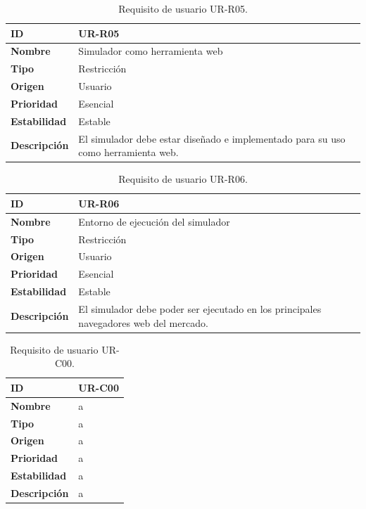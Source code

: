 \begin{center}
\begin{table}[htbp]
\centering
\begin{tabular}{@{}p{2.5cm} p{9cm}@{}} 
\toprule
\textbf{ID} 				& UR-R05 \\
\midrule
\textbf{Nombre} 			& Simulador como herramienta web \\
\midrule
\textbf{Tipo} 			& Restricción \\
\midrule
\textbf{Origen} 			& Usuario \\
\midrule
\textbf{Prioridad}		& Esencial \\
\midrule
\textbf{Estabilidad} 		& Estable \\
\midrule
\textbf{Descripción} 	& El simulador debe estar diseñado e implementado para su uso como herramienta web. \\
\bottomrule
\end{tabular}
\caption{Requisito de usuario UR-R05.}
\label{tab:urr05}
\end{table}
\end{center}

\begin{center}
\begin{table}[htbp]
\centering
\begin{tabular}{@{}p{2.5cm} p{9cm}@{}} 
\toprule
\textbf{ID} 				& UR-R06 \\
\midrule
\textbf{Nombre} 			& Entorno de ejecución del simulador \\
\midrule
\textbf{Tipo} 			& Restricción \\
\midrule
\textbf{Origen} 			& Usuario \\
\midrule
\textbf{Prioridad}		& Esencial \\
\midrule
\textbf{Estabilidad} 		& Estable \\
\midrule
\textbf{Descripción} 	& El simulador debe poder ser ejecutado en los principales navegadores web del mercado. \\
\bottomrule
\end{tabular}
\caption{Requisito de usuario UR-R06.}
\label{tab:urr06}
\end{table}
\end{center}


\iffalse

\begin{center}
\begin{table}[htbp]
\centering
\begin{tabular}{@{}p{2.5cm} p{9cm}@{}} 
\toprule
\textbf{ID} 				& UR-C00 \\
\midrule
\textbf{Nombre} 			& a \\
\midrule
\textbf{Tipo} 			& a \\
\midrule
\textbf{Origen} 			& a \\
\midrule
\textbf{Prioridad}		& a \\
\midrule
\textbf{Estabilidad} 		& a \\
\midrule
\textbf{Descripción} 	& a \\
\bottomrule
\end{tabular}
\caption{Requisito de usuario UR-C00.}
\label{tab:urc00}
\end{table}
\end{center}


